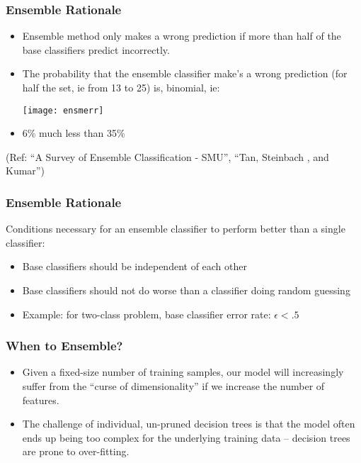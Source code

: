 \begin{frame}[fragile]\frametitle{Ensemble Rationale}
\begin{itemize}
\item Ensemble method only makes a wrong prediction if more than half of the base classifiers predict incorrectly.
\item The probability that the ensemble classifier make's a wrong prediction (for half the set, ie from 13 to 25) is, binomial, ie:
\begin{center}
\texttt{[image: ensmerr]}
\end{center}
\item 6\% much less than 35\%

\end{itemize}
{\tiny (Ref: ``A Survey of Ensemble Classification - SMU'', ``Tan, Steinbach , and Kumar'')}
\end{frame}

\begin{frame}[fragile]\frametitle{Ensemble Rationale}
Conditions necessary for an ensemble classifier to perform better than a single classifier:
\begin{itemize}

\item Base classifiers should be independent of each other
\item Base classifiers should not do worse than a classifier doing random guessing
\item Example: for two-class problem, base classifier error rate: $\epsilon< .5$

\end{itemize}
\end{frame}

\begin{frame}[fragile]\frametitle{When to Ensemble?}
\begin{itemize}
\item Given a fixed-size number of training samples, our model will increasingly suffer from the ``curse of dimensionality'' if we increase the number of features.
\item The challenge of individual, un-pruned decision trees is that the model often ends up being too complex for the underlying training data -- decision trees are prone to over-fitting.
\end{itemize}
\end{frame}




